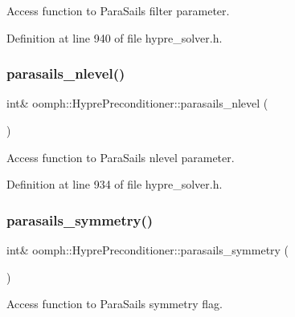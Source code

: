 Access function to Para\+Sails filter parameter. 



Definition at line 940 of file hypre\+\_\+solver.\+h.

\mbox{\label{classoomph_1_1HyprePreconditioner_a29559cc7a6c8247209a20d2031111529}} 
\subsubsection{\texorpdfstring{parasails\+\_\+nlevel()}{parasails\_nlevel()}}
{\footnotesize\ttfamily int\& oomph\+::\+Hypre\+Preconditioner\+::parasails\+\_\+nlevel (\begin{DoxyParamCaption}{ }\end{DoxyParamCaption})\hspace{0.3cm}{\ttfamily [inline]}}



Access function to Para\+Sails nlevel parameter. 



Definition at line 934 of file hypre\+\_\+solver.\+h.

\mbox{\label{classoomph_1_1HyprePreconditioner_ab169873191bebd4dfa39455e8c2f3698}} 
\subsubsection{\texorpdfstring{parasails\+\_\+symmetry()}{parasails\_symmetry()}}
{\footnotesize\ttfamily int\& oomph\+::\+Hypre\+Preconditioner\+::parasails\+\_\+symmetry (\begin{DoxyParamCaption}{ }\end{DoxyParamCaption})\hspace{0.3cm}{\ttfamily [inline]}}



Access function to Para\+Sails symmetry flag. 



